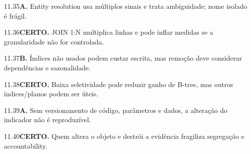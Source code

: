 \begin{solucao}{11.35}\textbf{A.} Entity resolution usa múltiplos sinais e trata ambiguidade; nome isolado é frágil.\end{solucao}
\begin{solucao}{11.36}\textbf{CERTO.} JOIN 1:N multiplica linhas e pode inflar medidas se a granularidade não for controlada.\end{solucao}
\begin{solucao}{11.37}\textbf{B.} Índices não usados podem custar escrita, mas remoção deve considerar dependências e sazonalidade.\end{solucao}
\begin{solucao}{11.38}\textbf{CERTO.} Baixa seletividade pode reduzir ganho de B-tree, mas outros índices/planos podem ser úteis.\end{solucao}
\begin{solucao}{11.39}\textbf{A.} Sem versionamento de código, parâmetros e dados, a alteração do indicador não é reproduzível.\end{solucao}
\begin{solucao}{11.40}\textbf{CERTO.} Quem altera o objeto e destrói a evidência fragiliza segregação e accountability.\end{solucao}

